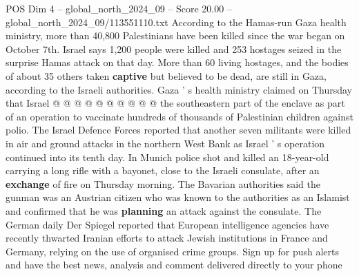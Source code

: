 \begin{textsample}{POS Dim 4 – global\_north\_2024\_09 – Score 20.00 – global\_north\_2024\_09/113551110.txt}
According to the Hamas-run Gaza health ministry, more than 40,800 Palestinians have been killed since the war began on October 7th.
Israel says 1,200 people were killed and 253 hostages seized in the surprise Hamas attack on that day.
More than 60 living hostages, and the bodies of about 35 others taken \textbf{captive} but believed to be dead, are still in Gaza, according to the Israeli authorities.
Gaza ' s health ministry claimed on Thursday that Israel @ @ @ @ @ @ @ @ @ @ the southeastern part of the enclave as part of an operation to vaccinate hundreds of thousands of Palestinian children against polio.
The Israel Defence Forces reported that another seven militants were killed in air and ground attacks in the northern West Bank as Israel ' s operation continued into its tenth day.
In Munich police shot and killed an 18-year-old carrying a long rifle with a bayonet, close to the Israeli consulate, after an \textbf{exchange} of fire on Thursday morning.
The Bavarian authorities said the gunman was an Austrian citizen who was known to the authorities as an Islamist and confirmed that he was \textbf{planning} an attack against the consulate.
The German daily Der Spiegel reported that European intelligence agencies have recently thwarted Iranian efforts to attack Jewish institutions in France and Germany, relying on the use of organised crime groups.
Sign up for push alerts and have the best news, analysis and comment delivered directly to your phone

\end{textsample}
